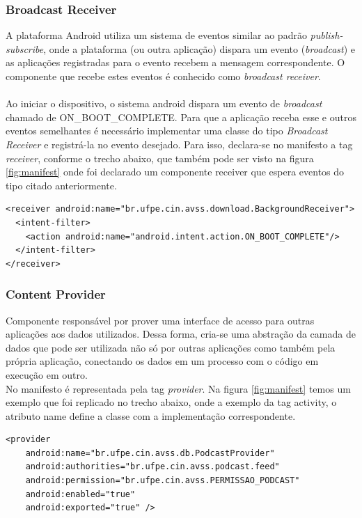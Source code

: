 \documentclass[a4paper,12pt]{article}
\begin{document}
\subsubsection{Broadcast Receiver}

A plataforma Android utiliza um sistema de eventos similar ao padrão \textit{publish-subscribe}, onde a plataforma (ou outra aplicação) dispara um evento (\textit{broadcast}) e as aplicações registradas para o evento recebem a mensagem correspondente. O componente que recebe estes eventos é conhecido como \textit{broadcast receiver}.\\
\\
Ao iniciar o dispositivo, o sistema android dispara um evento de \textit{broadcast} chamado de ON\_BOOT\_COMPLETE. Para que a aplicação receba esse e outros eventos semelhantes é necessário implementar uma classe do tipo \textit{Broadcast Receiver} e registrá-la no evento desejado. Para isso, declara-se no manifesto a tag \textit{receiver}, conforme o trecho abaixo, que também pode ser visto na figura \ref{fig:manifest} onde foi declarado um componente receiver que espera eventos do tipo citado anteriormente.
{\fontsize{9pt}{12pt}
\begin{verbatim}
<receiver android:name="br.ufpe.cin.avss.download.BackgroundReceiver">
  <intent-filter>
    <action android:name="android.intent.action.ON_BOOT_COMPLETE"/>
  </intent-filter>
</receiver>
\end{verbatim}
}

\subsubsection{Content Provider}
\label{sec:provider}
Componente responsável por prover uma interface de acesso para outras aplicações aos dados utilizados. Dessa forma, cria-se uma abstração da camada de dados que pode ser utilizada não só por outras aplicações como também pela própria aplicação, conectando os dados em um processo com o código em execução em outro.\\

No manifesto é representada pela tag \textit{provider}. Na figura \ref{fig:manifest} temos um exemplo que foi replicado no trecho abaixo, onde a exemplo da tag activity, o atributo name define a classe com a implementação correspondente.\\

{\fontsize{9pt}{12pt}
\begin{verbatim}
<provider
    android:name="br.ufpe.cin.avss.db.PodcastProvider"
    android:authorities="br.ufpe.cin.avss.podcast.feed"
    android:permission="br.ufpe.cin.avss.PERMISSAO_PODCAST"
    android:enabled="true"
    android:exported="true" />

\end{verbatim}
}
\end{document}
